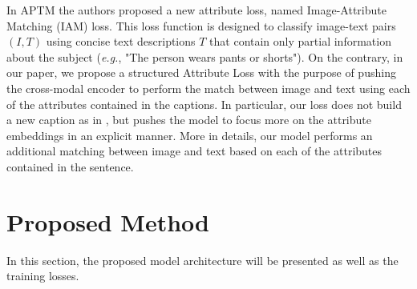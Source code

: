 \documentclass[acmsmall]{acmart}
\newcommand{\anote}[1]{\textcolor{red}{AP: #1}}
\begin{document}
In APTM the authors proposed a new attribute loss, named Image-Attribute Matching (IAM) loss. This loss function is designed to classify image-text pairs $(I,T)$ using concise text descriptions $T$ that contain only partial information about the subject (\textit{e.g.}, "The person wears pants or shorts"). On the contrary, in our paper, we propose a structured Attribute Loss with the purpose of pushing the cross-modal encoder to perform the match between image and text using each of the attributes contained in the captions. In particular, our loss does not build a new caption as in \cite{yang2023towards}, but pushes the model to focus more on the attribute embeddings in an explicit manner. More in details, our model performs an additional matching between image and text based on each of the attributes contained in the sentence.






\section{Proposed Method}
In this section, the proposed model architecture will be presented as well as the training losses.
\end{document}
